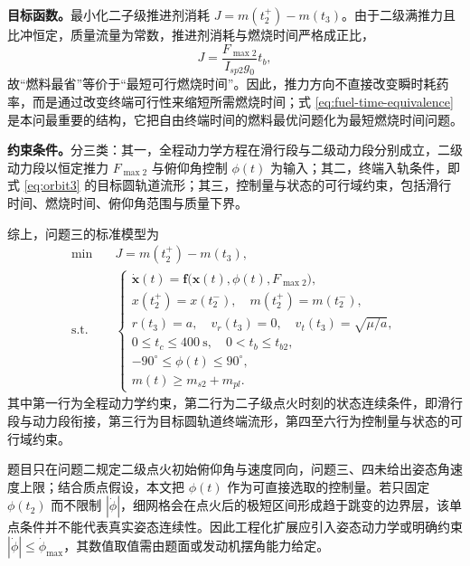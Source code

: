 \documentclass[withoutpreface,bwprint]{cumcmthesis}
\begin{document}
\textbf{目标函数。}最小化二子级推进剂消耗 $J=m(t_2^+)-m(t_3)$。由于二级满推力且比冲恒定，质量流量为常数，推进剂消耗与燃烧时间严格成正比，
\begin{equation}
J=\frac{F_{\max2}}{I_{sp2}g_0}t_b,
\label{eq:fuel-time-equivalence}
\end{equation}
故“燃料最省”等价于“最短可行燃烧时间”。因此，推力方向不直接改变瞬时耗药率，而是通过改变终端可行性来缩短所需燃烧时间；式 \eqref{eq:fuel-time-equivalence} 是本问最重要的结构，它把自由终端时间的燃料最优问题化为最短燃烧时间问题。

\textbf{约束条件。}分三类：其一，全程动力学方程在滑行段与二级动力段分别成立，二级动力段以恒定推力 $F_{\max2}$ 与俯仰角控制 $\phi(t)$ 为输入；其二，终端入轨条件，即式 \eqref{eq:orbit3} 的目标圆轨道流形；其三，控制量与状态的可行域约束，包括滑行时间、燃烧时间、俯仰角范围与质量下界。

综上，问题三的标准模型为
\begin{equation}
\begin{aligned}
\min\quad &J=m(t_2^+)-m(t_3),\\
\text{s.t.}\quad &\begin{cases}
\dot{\bm x}(t)=\bm f\big(\bm x(t),\phi(t),F_{\max2}\big), \\
x(t_2^+)=x(t_2^-),\quad m(t_2^+)=m(t_2^-),\\
r(t_3)=a,\quad v_r(t_3)=0,\quad v_t(t_3)=\sqrt{\mu/a},\\
0\le t_c\le400\ \mathrm{s},\quad 0<t_b\le t_{b2},\\
-90^\circ\le\phi(t)\le90^\circ,\\
m(t)\ge m_{s2}+m_{pl}.
\end{cases}
\end{aligned}
\label{eq:ocpq3}
\end{equation}
其中第一行为全程动力学约束，第二行为二子级点火时刻的状态连续条件，即滑行段与动力段衔接，第三行为目标圆轨道终端流形，第四至六行为控制量与状态的可行域约束。

题目只在问题二规定二级点火初始俯仰角与速度同向，问题三、四未给出姿态角速度上限；结合质点假设，本文把 $\phi(t)$ 作为可直接选取的控制量。若只固定 $\phi(t_2)$ 而不限制 $|\dot\phi|$，细网格会在点火后的极短区间形成趋于跳变的边界层，该单点条件并不能代表真实姿态连续性。因此工程化扩展应引入姿态动力学或明确约束 $|\dot\phi|\le\dot\phi_{\max}$，其数值取值需由题面或发动机摆角能力给定。
\end{document}
